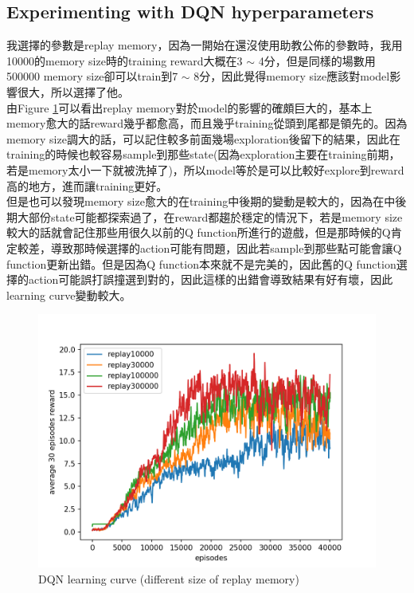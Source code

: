 \documentclass[12pt, a4paper]{article}
\begin{document}
\begin{CJK}{UTF8}{bkai}
\section{Experimenting with DQN hyperparameters}
我選擇的參數是replay memory，因為一開始在還沒使用助教公佈的參數時，我用10000的memory size時的training reward大概在3 $\sim$ 4分，但是同樣的場數用500000 memory size卻可以train到7 $\sim$ 8分，因此覺得memory size應該對model影響很大，所以選擇了他。\\
由Figure \ref{fig:f7}可以看出replay memory對於model的影響的確頗巨大的，基本上memory愈大的話reward幾乎都愈高，而且幾乎training從頭到尾都是領先的。因為memory size調大的話，可以記住較多前面幾場exploration後留下的結果，因此在training的時候也較容易sample到那些state(因為exploration主要在training前期，若是memory太小一下就被洗掉了)，所以model等於是可以比較好explore到reward高的地方，進而讓training更好。\\
但是也可以發現memory size愈大的在training中後期的變動是較大的，因為在中後期大部份state可能都探索過了，在reward都趨於穩定的情況下，若是memory size較大的話就會記住那些用很久以前的Q function所進行的遊戲，但是那時候的Q肯定較差，導致那時候選擇的action可能有問題，因此若sample到那些點可能會讓Q function更新出錯。但是因為Q function本來就不是完美的，因此舊的Q function選擇的action可能誤打誤撞選到對的，因此這樣的出錯會導致結果有好有壞，因此learning curve變動較大。

\begin{figure}[!htb]
\centering
\includegraphics[scale=0.7]{replaysize_avg_reward.png}

\caption{DQN learning curve (different size of replay memory)}
\label{fig:f7}
\end{figure}




\end{CJK}
\end{document}
